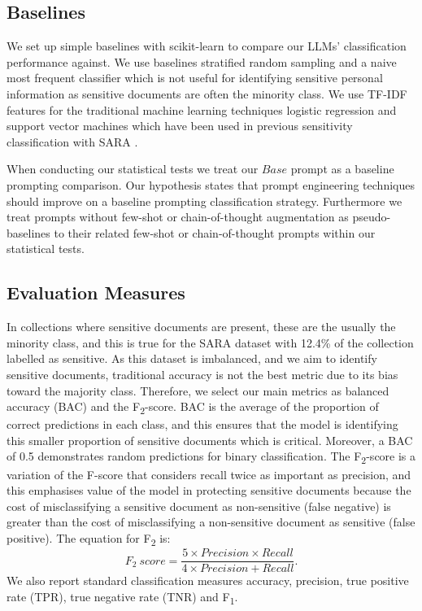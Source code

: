 \subsection{Baselines}
We set up simple baselines with scikit-learn \cite{pedregosa2011scikit} to compare our LLMs’ classification performance against. We use baselines stratified random sampling and a naive most frequent classifier which is not useful for identifying sensitive personal information as sensitive documents are often the minority class. We use TF-IDF features for the traditional machine learning techniques logistic regression and support vector machines which have been used in previous sensitivity classification with SARA \cite{mckechnie2024sara}.

When conducting our statistical tests we treat our $Base$ prompt as a baseline prompting comparison. Our hypothesis states that prompt engineering techniques should improve on a baseline prompting classification strategy. Furthermore we treat prompts without few-shot or chain-of-thought augmentation as pseudo-baselines to their related few-shot or chain-of-thought prompts within our statistical tests.

\subsection{Evaluation Measures}
In collections where sensitive documents are present, these are the usually the minority class, and this is true for the SARA dataset with 12.4\% of the collection labelled as sensitive. As this dataset is imbalanced, and we aim to identify sensitive documents, traditional accuracy is not the best metric due to its bias toward the majority class. Therefore, we select our main metrics as balanced accuracy (BAC) and the F\textsubscript{2}-score. BAC is the average of the proportion of correct predictions in each class, and this ensures that the model is identifying this smaller proportion of sensitive documents which is critical. Moreover, a BAC of 0.5 demonstrates random predictions for binary classification. The F\textsubscript{2}-score is a variation of the F-score that considers recall twice as important as precision, and this emphasises value of the model in protecting sensitive documents because the cost of misclassifying a sensitive document as non-sensitive (false negative) is greater than the cost of misclassifying a non-sensitive document as sensitive (false positive). The equation for F\textsubscript{2} is:
\begin{equation*}
F_2\ score = \frac{5 \times Precision \times Recall}{4 \times Precision + Recall} .
\end{equation*}
We also report standard classification measures accuracy, precision, true positive rate (TPR), true negative rate (TNR) and F\textsubscript{1}.

